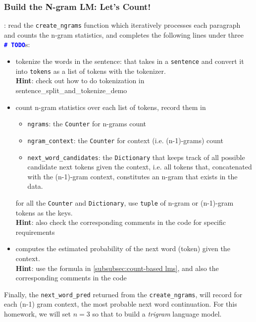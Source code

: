 \subsubsection{Build the N-gram LM: Let's Count!}
\noindent\todo{}: read the \texttt{create\_ngrams} function which iteratively processes each paragraph and counts the n-gram statistics, and completes the following lines under three \textcolor{blue}{\texttt{\textbf{\#~TODO}}}s:
\begin{itemize}
    \item tokenize the words in the sentence: that takes in a \texttt{sentence} and convert it into \texttt{tokens} as a list of tokens with the tokenizer. \\
    \textbf{Hint}: check out how to do tokenization in sentence\_split\_and\_tokenize\_demo
    \item count n-gram statistics over each list of tokens, record them in
    \begin{itemize}
        \item \texttt{ngrams}: the \texttt{Counter} for n-grams count
        \item \texttt{ngram\_context}: the \texttt{Counter} for context (i.e. (n-1)-grams) 
        count
        \item \texttt{next\_word\_candidates}: the \texttt{Dictionary} that keeps track of all possible candidate next tokens given the context, i.e. all tokens that, concatenated with the (n-1)-gram context, constitutes an n-gram that exists in the data. 
    \end{itemize}
    for all the \texttt{Counter} and \texttt{Dictionary}, use \texttt{tuple} of n-gram or (n-1)-gram tokens as the keys. \\
    \textbf{Hint}: also check the corresponding comments in the code for specific requirements
    \item computes the estimated probability of the next word (token) given the context. \\\textbf{Hint}: use the formula in \autoref{subsubsec:count-based lms}, and also the corresponding comments in the code
\end{itemize}
Finally, the \texttt{next\_word\_pred} returned from the \texttt{create\_ngrams}, will record for each (n-1) gram context, the most probable next word continuation. For this homework, we will set $n=3$ so that to build a \textit{trigram} language model.

